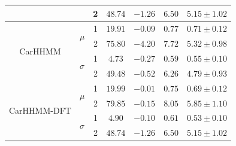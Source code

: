 \begin{table}
{\begin{tabular}{ccccccc}
                           &                               & 2                             & $48.74$                         & $-1.26$                     & $6.50$                             & $5.15 \pm 1.02$                             \\ \hline
\multirow{4}{*}{CarHHMM}   & \multirow{2}{*}{$\mu$}        & 1                             & $19.91$                         & $-0.09$                     & $0.77$                             & $0.71 \pm 0.12$                             \\
                           &                               & 2                             & $75.80$                         & $-4.20$                     & $7.72$                             & $5.32 \pm 0.98$                             \\
                           & \multirow{2}{*}{$\sigma$}     & 1                             & $4.73$                         & $-0.27$                     & $0.59$                             & $0.55 \pm 0.10$                             \\
                           &                               & 2                             & $49.48$                         & $-0.52$                     & $6.26$                             & $4.79 \pm 0.93$                             \\ \hline
\multirow{4}{*}{CarHHMM-DFT}& \multirow{2}{*}{$\mu$}        & 1                             & $19.99$                         & $-0.01$                     & $0.75$                             & $0.69 \pm 0.12$                             \\
                           &                               & 2                             & $79.85$                         & $-0.15$                     & $8.05$                             & $5.85 \pm 1.10$                             \\
                           & \multirow{2}{*}{$\sigma$}     & 1                             & $4.90$                         & $-0.10$                     & $0.61$                             & $0.53 \pm 0.10$                             \\
                           &                               & 2                             & $48.74$                         & $-1.26$                     & $6.50$                             & $5.15 \pm 1.02$                             
\end{tabular}
}
\label{table:dive_duration}
\end{table}


